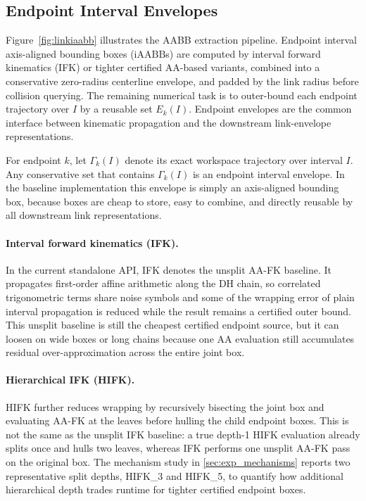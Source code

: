 \documentclass[journal]{IEEEtran}
\newcommand{\iAABB}{\ensuremath{\mathrm{iAABB}}}
\begin{document}
\subsection{Endpoint Interval Envelopes}\label{sec:rewrite_endpoint_env}

\noindent Figure~\ref{fig:linkiaabb} illustrates the AABB extraction pipeline.
Endpoint interval axis-aligned bounding boxes (\iAABB{}s) are computed by
interval forward kinematics (IFK) or tighter certified AA-based variants,
combined into a conservative zero-radius centerline envelope, and padded by the
link radius before collision querying.
The remaining numerical task is to outer-bound each endpoint trajectory over
$I$ by a reusable set $E_k(I)$.
Endpoint envelopes are the common interface between kinematic propagation and
the downstream link-envelope representations.

For endpoint $k$, let $\Gamma_k(I)$ denote its exact workspace trajectory over
interval $I$. Any conservative set that contains $\Gamma_k(I)$ is an endpoint
interval envelope. In the baseline implementation this envelope is simply an
axis-aligned bounding box, because boxes are cheap to store, easy to combine,
and directly reusable by all downstream link representations.

\paragraph{Interval forward kinematics (IFK).}
In the current standalone API, IFK denotes the unsplit AA-FK baseline. It
propagates first-order affine arithmetic along the DH chain, so correlated
trigonometric terms share noise symbols and some of the wrapping error of plain
interval propagation is reduced while the result remains a certified outer
bound. This unsplit baseline is still the cheapest certified endpoint source,
but it can loosen on wide boxes or long chains because one AA evaluation still
accumulates residual over-approximation across the entire joint box.

\paragraph{Hierarchical IFK (HIFK).}
HIFK further reduces wrapping by recursively bisecting the joint box and
evaluating AA-FK at the leaves before hulling the child endpoint boxes. This is
not the same as the unsplit IFK baseline: a true depth-1 HIFK evaluation
already splits once and hulls two leaves, whereas IFK performs one unsplit
AA-FK pass on the original box. The mechanism study in
\cref{sec:exp_mechanisms} reports two representative split depths, HIFK\_3 and
HIFK\_5, to quantify how additional hierarchical depth trades runtime for
tighter certified endpoint boxes.
\end{document}
